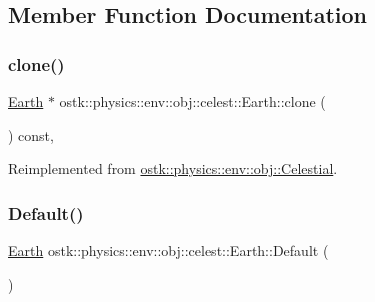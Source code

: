 \subsection{Member Function Documentation}
\mbox{\label{classostk_1_1physics_1_1env_1_1obj_1_1celest_1_1_earth_ae86664b9d6fc870baa1dac5c3219f784}} 
\subsubsection{\texorpdfstring{clone()}{clone()}}
{\footnotesize\ttfamily \hyperlink{classostk_1_1physics_1_1env_1_1obj_1_1celest_1_1_earth}{Earth} $\ast$ ostk\+::physics\+::env\+::obj\+::celest\+::\+Earth\+::clone (\begin{DoxyParamCaption}{ }\end{DoxyParamCaption}) const\hspace{0.3cm}{\ttfamily [override]}, {\ttfamily [virtual]}}



Reimplemented from \hyperlink{classostk_1_1physics_1_1env_1_1obj_1_1_celestial_a87c6f3ec3c0ec9758ae52e3edc3fc5df}{ostk\+::physics\+::env\+::obj\+::\+Celestial}.

\mbox{\label{classostk_1_1physics_1_1env_1_1obj_1_1celest_1_1_earth_ab23224bee36577e7ab40576384ba8f2e}} 
\subsubsection{\texorpdfstring{Default()}{Default()}}
{\footnotesize\ttfamily \hyperlink{classostk_1_1physics_1_1env_1_1obj_1_1celest_1_1_earth}{Earth} ostk\+::physics\+::env\+::obj\+::celest\+::\+Earth\+::\+Default (\begin{DoxyParamCaption}{ }\end{DoxyParamCaption})\hspace{0.3cm}{\ttfamily [static]}}



